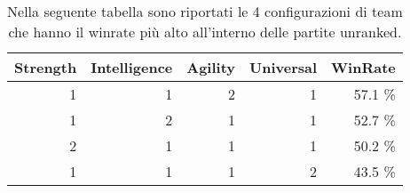 \begin{table}[htbp]
\centering
\caption{Nella seguente tabella sono riportati le 4 configurazioni di team che hanno il winrate più alto all'interno delle partite unranked.}
\label{tabella_winrate_team_unranked_sintetico}
\begin{tabular}{|r|r|r|r|r|}
\hline
\multicolumn{1}{|l|}{Strength} & \multicolumn{1}{l|}{Intelligence} & \multicolumn{1}{l|}{Agility} & \multicolumn{1}{l|}{Universal} & \multicolumn{1}{l|}{WinRate} \\ \hline
1 & 1 & 2 & 1 &   57.1 \% \\ \hline
1 & 2 & 1 & 1 &   52.7 \%  \\ \hline
2 & 1 & 1 & 1 &   50.2 \%  \\ \hline
1 & 1 & 1 & 2 &   43.5 \% \\ \hline
\end{tabular}
\end{table}